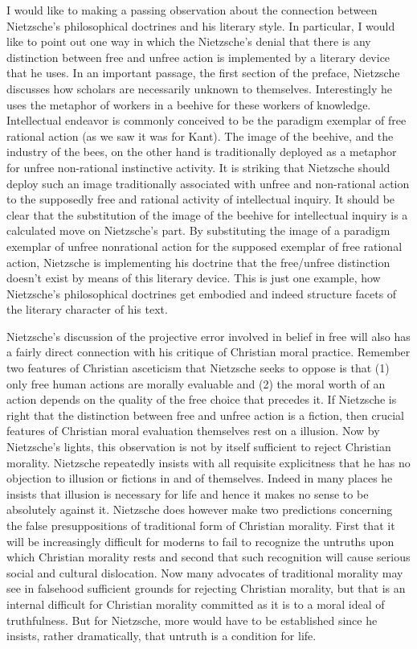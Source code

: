 I would like to making a passing observation about the connection between Nietzsche's philosophical doctrines and his literary style. In particular, I would like to point out one way in which the Nietzsche's denial that there is any distinction between free and unfree action is implemented by a literary device that he uses. In an important passage, the first section of the preface, Nietzsche discusses how scholars are necessarily unknown to themselves. Interestingly he uses the metaphor of workers in a beehive for these workers of knowledge. Intellectual endeavor is commonly conceived to be the paradigm exemplar of free rational action (as we saw it was for Kant). The image of the beehive, and the industry of the bees, on the other hand is traditionally deployed as a metaphor for unfree non-rational instinctive activity. It is striking that Nietzsche should deploy such an image traditionally associated with unfree and non-rational action to the supposedly free and rational activity of intellectual inquiry. It should be clear that the substitution of the image of the beehive for intellectual inquiry is a calculated move on Nietzsche's part. By substituting the image of a paradigm exemplar of unfree nonrational action for the supposed exemplar of free rational action, Nietzsche is implementing his doctrine that the free/unfree distinction doesn't exist by means of this literary device. This is just one example, how Nietzsche's philosophical doctrines get embodied and indeed structure facets of the literary character of his text.

Nietzsche's discussion of the projective error involved in belief in free will also has a fairly direct connection with his critique of Christian moral practice. Remember two features of Christian asceticism that Nietzsche seeks to oppose is that (1) only free human actions are morally evaluable and (2) the moral worth of an action depends on the quality of the free choice that precedes it. If Nietzsche is right that the distinction between free and unfree action is a fiction, then crucial features of Christian moral evaluation themselves rest on a illusion. Now by Nietzsche's lights, this observation is not by itself sufficient to reject Christian morality. Nietzsche repeatedly insists with all requisite explicitness that he has no objection to illusion or fictions in and of themselves. Indeed in many places he insists that illusion is necessary for life and hence it makes no sense to be absolutely against it. Nietzsche does however make two predictions concerning the false presuppositions of traditional form of Christian morality. First that it will be increasingly difficult for moderns to fail to recognize the untruths upon which Christian morality rests and second that such recognition will cause serious social and cultural dislocation. Now many advocates of traditional morality may see in falsehood sufficient grounds for rejecting Christian morality, but that is an internal difficult for Christian morality committed as it is to a moral ideal of truthfulness. But for Nietzsche, more would have to be established since he insists, rather dramatically, that untruth is a condition for life. \change

